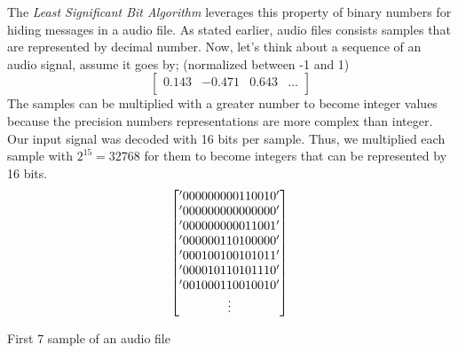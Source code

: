 \documentclass[twocolumns]{IEEEtran}
\begin{document}
	The \textit{Least Significant Bit Algorithm} leverages this property of binary numbers for hiding messages in a audio file. As stated earlier, audio files consists samples that are represented by decimal number. Now, let's think about a sequence of an audio signal, assume it goes by; (normalized between -1 and 1)\\
	\begin{equation}
	\begin{bmatrix}
		0.143 & -0.471 & 0.643 & \hdots \\
	\end{bmatrix}
	\end{equation}
	The samples can be multiplied with a greater number to become integer values because the precision numbers representations are more complex than integer. Our input signal was decoded with 16 bits per sample. Thus, we multiplied each sample with $2^{15} = 32768$ for them to become integers that can be represented by 16 bits.
	\begin{equation}
		\begin{bmatrix}
		'000000000110010' \\
		'000000000000000' \\
		'000000000011001' \\
		'000000110100000' \\
		'000100100101011' \\
		'000010110101110' \\
		'001000110010010' \\
		\vdots
		\end{bmatrix} \\ \\		
	\end{equation}
	\begin{center}
		First 7 sample of an audio file
	\end{center}
	
\end{document}
